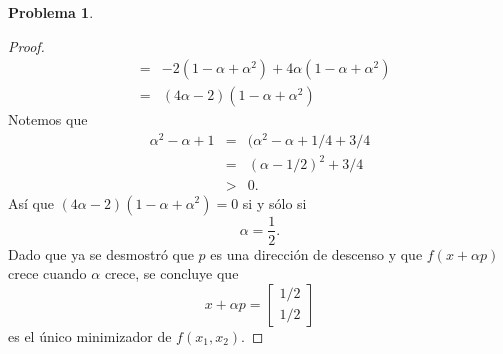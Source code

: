 \documentclass[12pt,letterpaper]{article}
\theoremstyle{definition}
\newtheorem{problm}{Problema}
\begin{document}
\begin{problm}
\begin{proof}
\begin{eqnarray*}
		  	  & = & -2 (1 -\alpha + \alpha^2) + 4\alpha (1 -\alpha + \alpha^2) \\
		  	  & = & ( 4\alpha -2 ) (1 -\alpha + \alpha^2)
		\end{eqnarray*}
		Notemos que
		\begin{eqnarray*}
			\alpha^2 - \alpha + 1 & = & (\alpha^2 - \alpha + 1/4 + 3/4 \\
								  & = & (\alpha - 1/2)^2 + 3/4  \\
								  & > & 0.
		\end{eqnarray*}
		Así que $ ( 4\alpha -2 ) (1 -\alpha + \alpha^2) =0 $ si y sólo si
		\[ \alpha = \dfrac{1}{2}. \]
		Dado que ya se desmostró que $ p $ es una dirección de descenso y que $ f(x + \alpha p) $ crece cuando $ \alpha $ crece, se concluye que 
		\[ x + \alpha p = \left[\begin{matrix}
								1/2 \\
								1/2
		\end{matrix}\right] \]
		es el único minimizador de $ f(x_1, x_2) $.
	\end{proof}
\end{problm}
\end{document}
